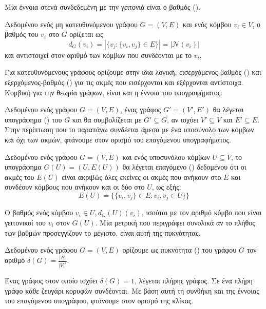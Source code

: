Μία έννοια στενά συνδεδεμένη με την γειτονιά είναι ο βαθμός ().
\begin{definition}[Βαθμός]
Δεδομένου ενός μη κατευθυνόμενου γράφου $G = ( V, E )$ και ενός κόμβου $v_{i} \in V$, ο βαθμός του $v_{i}$ στο $G$ ορίζεται ως $$d_{G} ( v_{i} ) = |\{ v_{j} : \{ v_{i} , v_{j} \} \in E \}| = |\mathcal{N} ( v_{i} )|$$ και αντιστοιχεί στον αριθμό των κόμβων που συνδέονται με το $v_{i}$,
\end{definition}
Για κατευθυνόμενους γράφους ορίζουμε στην ίδια λογική, εισερχόμενος-βαθμός () και εξερχόμενος-βαθμός () για τις ακμές που εισέρχονται και εξέρχονται αντίστοιχα.
Κομβική για την θεωρία γράφων, είναι και η έννοια του υπογραφήματος.
\begin{definition}[Υπογράφημα]
Δεδομένου ενός γράφου $G = ( V, E )$, ένας γράφος $G' = ( V', E')$ θα λέγεται υπογράφημα () του $G$ και θα συμβολίζεται με $G' \subseteq G$, αν ισχύει $V' \subseteq V$ και $E' \subseteq E$.
\label{def:subgraph}
Στην περίπτωση που το παραπάνω συνδέεται άμεσα με ένα υποσύνολο των κόμβων και όχι των ακμών, φτάνουμε στον ορισμό του επαγόμενου υπογραφήματος.
\end{definition}
\begin{definition}
Δεδομένου ενός γράφου $G = ( V, E )$ και ενός υποσυνόλου κόμβων $U \subseteq V$, το υπογράφημα $G(U) = (U, E(U))$ θα λέγεται επαγόμενο () δεδομένου ότι οι ακμές του $E(U)$ είναι ακριβώς όλες εκείνες οι ακμές που ανήκουν στο $E$ και συνδέουν κόμβους που ανήκουν και οι δύο στο $U$, ως εξής:
\begin{equation}
    E(U) = \{\{v_{i},v_{j}\}\in E: v_{i}, v_{j}\in U\}\}
\end{equation}
\label{def:induced_subgraph}
\end{definition}
Ο βαθμός ενός κόμβου $v_{i} \in U, d_{G}(U)(v_{i})$, ισούται με τον αριθμό κόμβο που είναι γειτονικοί του $v_{i}$ στον $G(U)$.
Μία μετρική που περιγράφει συνολικά αν το πλήθος των βαθμών προσεγγίζουν το μέγιστο, είναι αυτή της πυκνότητας.
\begin{definition}[Πυκνότητα]
Δεδομένου ενός γράφου $G = ( V, E )$ ορίζουμε ως πυκνότητα () του γράφου $G$ τον αριθμό $\delta(G) = \frac{|E|}{|V|^{2}}$.
\end{definition}
Ένας γράφος στον οποίο ισχύει $\delta(G) = 1$, λέγεται πλήρης γράφος.
Σε ένα πλήρη γράφο κάθε ζευγάρι κορυφών συνδέονται.
Με βάση αυτή τη συνθήκη και της έννοιας του επαγόμενου υπογράφου, φτάνουμε στον ορισμό της κλίκας.
